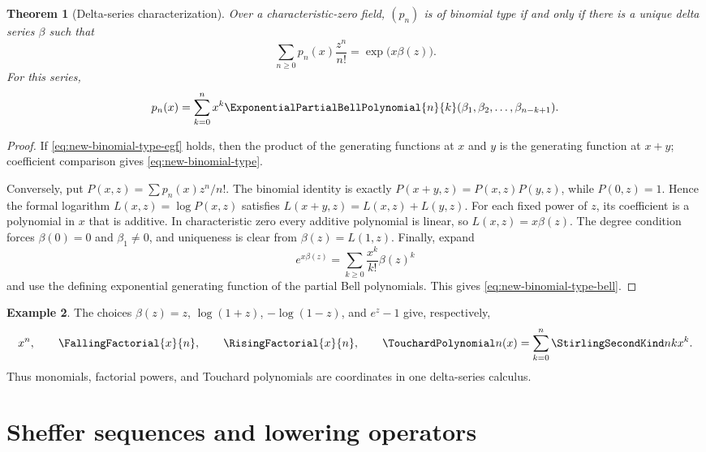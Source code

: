 \documentclass[11pt,a4paper,oneside,openany]{book}
\newtheorem{theorem}{Theorem}[chapter]
\theoremstyle{definition}
\newtheorem{example}[theorem]{Example}
\theoremstyle{remark}
\begin{document}
\begin{theorem}[Delta-series characterization]\label{thm:new-binomial-type}
Over a characteristic-zero field, $(p_n)$ is of binomial type if and only if
there is a unique delta series $\beta$ such that
\begin{equation}\label{eq:new-binomial-type-egf}
 \sum_{n\ge0}p_n(x)\frac{z^n}{n!}=\exp\bigl(x\beta(z)\bigr).
\end{equation}
For this series,
\begin{equation}\label{eq:new-binomial-type-bell}
 p_n(x)=\sum_{k=0}^n x^k
 \ExponentialPartialBellPolynomial{n}{k}(\beta_1,\beta_2,\ldots,\beta_{n-k+1}).
\end{equation}
\end{theorem}

\begin{proof}
If \eqref{eq:new-binomial-type-egf} holds, then the product of the generating
functions at $x$ and $y$ is the generating function at $x+y$; coefficient
comparison gives \eqref{eq:new-binomial-type}.

Conversely, put $P(x,z)=\sum p_n(x)z^n/n!$.  The binomial identity is exactly
$P(x+y,z)=P(x,z)P(y,z)$, while $P(0,z)=1$.  Hence the formal logarithm
$L(x,z)=\log P(x,z)$ satisfies $L(x+y,z)=L(x,z)+L(y,z)$.  For each fixed
power of $z$, its coefficient is a polynomial in $x$ that is additive.
In characteristic zero every additive polynomial is linear, so
$L(x,z)=x\beta(z)$.  The degree condition forces $\beta(0)=0$ and
$\beta_1\ne0$, and uniqueness is clear from $\beta(z)=L(1,z)$.
Finally, expand
\[
 e^{x\beta(z)}=\sum_{k\ge0}\frac{x^k}{k!}\beta(z)^k
\]
and use the defining exponential generating function of the partial Bell
polynomials.  This gives \eqref{eq:new-binomial-type-bell}.
\end{proof}

\begin{example}
The choices $\beta(z)=z$, $\log(1+z)$, $-\log(1-z)$, and $e^z-1$ give,
respectively,
\[
 x^n,\qquad \FallingFactorial{x}{n},\qquad \RisingFactorial{x}{n},\qquad
 \TouchardPolynomial n(x)=\sum_{k=0}^n\StirlingSecondKind nk x^k.
\]
Thus monomials, factorial powers, and Touchard polynomials are coordinates in
one delta-series calculus.
\end{example}

\section{Sheffer sequences and lowering operators}
\end{document}
